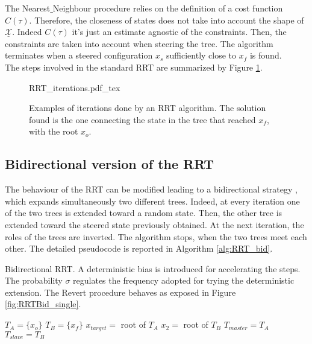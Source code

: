 The Nearest$\_$Neighbour procedure relies on the definition of a cost function $C(\tau)$. Therefore, the closeness of states does not take into account the shape of $\underline{\mathcal{X}}$. Indeed $C(\tau)$ it's just an estimate agnostic of the constraints. Then, the constraints are taken into account when steering the tree.
The algorithm terminates when a steered configuration $x_s$ sufficiently close to $x_f$ is found.     
\\
The steps involved in the standard RRT are summarized by Figure \ref{fig:RRT_single}.

 \begin{figure}
	 \centering
 \def\svgwidth{0.85 \columnwidth}
 {RRT_iterations.pdf_tex} 
	 \caption{Examples of iterations done by an RRT algorithm. The solution found is the one connecting the state in the tree that reached $x_f$, with the root $x_o$.}
 \label{fig:RRT_single}
 \end{figure}


\subsection{Bidirectional version of the RRT}
\label{sec:RRT_bidir}

The behaviour of the RRT can be modified leading to a bidirectional strategy \cite{RRT_bid}, which expands simultaneously two different trees. Indeed, at every iteration one of the two trees is extended toward a random state. Then, the other tree is extended toward the steered state previously obtained. At the next iteration, the roles of the trees are inverted. The algorithm stops, when the two trees meet each other. The detailed pseudocode is reported in Algorithm \ref{alg:RRT_bid}.

\begin{algorithm}
 \caption{Bidirectional RRT. A deterministic bias is introduced for accelerating the steps.
 The probability $\sigma$ regulates the frequency adopted for trying the deterministic extension. 
 The Revert procedure behaves as exposed in Figure \ref{fig:RRTBid_single}.
 \label{alg:RRT_bid}}
 $T_A = \lbrace x_o \rbrace$\; 
 $T_B = \lbrace x_f \rbrace$\; 
 $x_{target} = $ root of $T_A$\;
 $x_2 = $ root of $T_B$\;
 $T_{master} = T_A$\; 
 $T_{slave} = T_B$\;
\end{algorithm}


